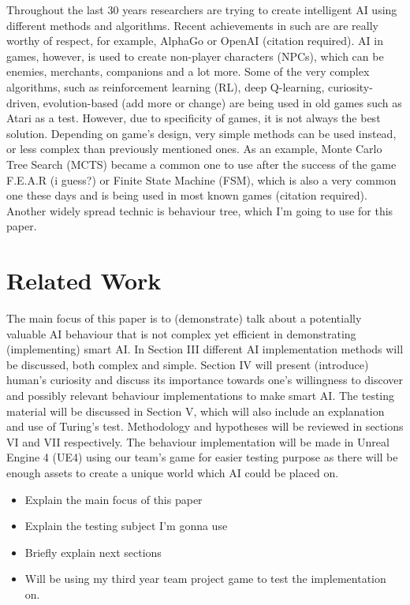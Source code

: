 \documentclass[journal]{IEEEtran}
\begin{document}
Throughout the last 30 years researchers are trying to create intelligent AI using different methods and algorithms. Recent achievements in such are are really worthy of respect, for example, AlphaGo or OpenAI (citation required). AI in games, however, is used to create non-player characters (NPCs), which can be enemies, merchants, companions and a lot more. Some of the very complex algorithms, such as reinforcement learning (RL), deep Q-learning, curiosity-driven, evolution-based (add more or change) are being used in old games such as Atari as a test. However, due to specificity of games, it is not always the best solution. Depending on game's design, very simple methods can be used instead, or less complex than previously mentioned ones. As an example, Monte Carlo Tree Search (MCTS) became a common one to use after the success of the game F.E.A.R (i guess?) or Finite State Machine (FSM), which is also a very common one these days and is being used in most known games (citation required). Another widely spread technic is behaviour tree, which I'm going to use for this paper.

\section{Related Work} %
The main focus of this paper is to (demonstrate) talk about a potentially valuable AI behaviour that is not complex yet efficient in demonstrating (implementing) smart AI. In Section III different AI implementation methods will be discussed, both complex and simple. Section IV will present (introduce) human's curiosity and discuss its importance towards one's willingness to discover and possibly relevant behaviour implementations to make smart AI. The testing material will be discussed in Section V, which will also include an explanation and use of Turing's test. Methodology and hypotheses will be reviewed in sections VI and VII respectively. The behaviour implementation will be made in Unreal Engine 4 (UE4) using our team's game for easier testing purpose as there will be enough assets to create a unique world which AI could be placed on.
\begin{itemize}
	\item Explain the main focus of this paper
	\item Explain the testing subject I'm gonna use
	\item Briefly explain next sections
	\item Will be using my third year team project game to test the implementation on.
\end{itemize}
\end{document}
